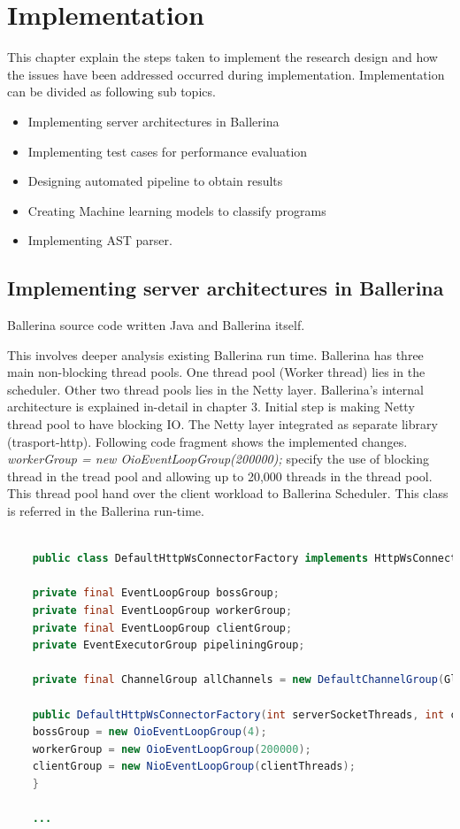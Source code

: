 \chapter{Implementation} \label{chap:4}

This chapter explain the steps taken to implement the research design and how the issues have been addressed occurred during implementation. Implementation can be divided as following sub topics.

\begin{itemize}
	\item Implementing server architectures in Ballerina
	\item Implementing test cases for performance evaluation
	\item Designing automated pipeline to obtain results
	\item Creating Machine learning models to classify programs
	\item Implementing AST parser.
\end{itemize}

\section{Implementing server architectures in Ballerina}

Ballerina source code written Java and Ballerina itself.

This involves deeper analysis existing Ballerina run time. Ballerina has three main non-blocking thread pools. One thread pool (Worker thread) lies in the scheduler. Other two thread pools lies in the Netty layer. Ballerina's internal architecture is explained in-detail in chapter 3. Initial step is making Netty thread pool to have blocking IO.
The Netty layer integrated as separate library (trasport-http)\cite{transport-http}. Following code fragment shows the implemented changes.  \textit{workerGroup = new OioEventLoopGroup(200000);} specify the use of blocking thread in the tread pool and allowing up to 20,000 threads in the thread pool. This thread pool hand over the client workload to Ballerina Scheduler. This class is referred in the Ballerina run-time.

\begin{lstlisting}[language=Java]

	public class DefaultHttpWsConnectorFactory implements HttpWsConnectorFactory {
	
	private final EventLoopGroup bossGroup;
	private final EventLoopGroup workerGroup;
	private final EventLoopGroup clientGroup;
	private EventExecutorGroup pipeliningGroup;
	
	private final ChannelGroup allChannels = new DefaultChannelGroup(GlobalEventExecutor.INSTANCE);
	
	public DefaultHttpWsConnectorFactory(int serverSocketThreads, int childSocketThreads, int clientThreads) {
	bossGroup = new OioEventLoopGroup(4);
	workerGroup = new OioEventLoopGroup(200000);
	clientGroup = new NioEventLoopGroup(clientThreads);
	}
	
	...
\end{lstlisting}


